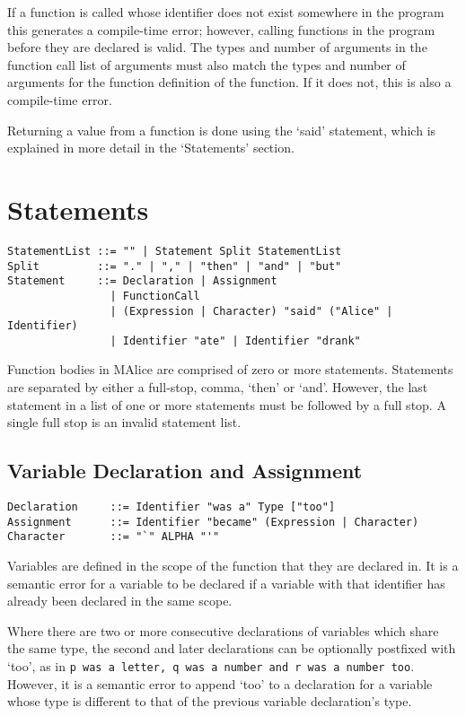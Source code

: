 \documentclass[a4wide, 11pt]{article}
\begin{document}
If a function is called whose identifier does not exist somewhere in the program this generates a compile-time error; however, calling functions in the program before they are declared is valid. The types and number of arguments in the function call list of arguments must also match the types and number of arguments for the function definition of the function. If it does not, this is also a compile-time error.

Returning a value from a function is done using the `said' statement, which is explained in more detail in the `Statements' section.

\section{Statements}

\begin{verbatim}
StatementList ::= "" | Statement Split StatementList
Split         ::= "." | "," | "then" | "and" | "but"
Statement     ::= Declaration | Assignment
                | FunctionCall
                | (Expression | Character) "said" ("Alice" | Identifier)
                | Identifier "ate" | Identifier "drank"
\end{verbatim}

Function bodies in MAlice are comprised of zero or more statements. Statements are separated by either a full-stop, comma, `then' or `and'. However, the last statement in a list of one or more statements must be followed by a full stop. A single full stop is an invalid statement list.

\subsection{Variable Declaration and Assignment}

\begin{verbatim}
Declaration     ::= Identifier "was a" Type ["too"]
Assignment      ::= Identifier "became" (Expression | Character)
Character       ::= "`" ALPHA "'"
\end{verbatim}

Variables are defined in the scope of the function that they are declared in. It is a semantic error for a variable to be declared if a variable with that identifier has already been declared in the same scope.

Where there are two or more consecutive declarations of variables which share the same type, the second and later declarations can be optionally postfixed with `too', as in \texttt{p was a letter, q was a number and r was a number too}. However, it is a semantic error to append `too' to a declaration for a variable whose type is different to that of the previous variable declaration's type.
\end{document}
